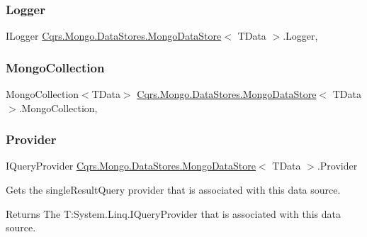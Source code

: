 \subsubsection{\texorpdfstring{Logger}{Logger}}
{\footnotesize\ttfamily I\+Logger \hyperlink{classCqrs_1_1Mongo_1_1DataStores_1_1MongoDataStore}{Cqrs.\+Mongo.\+Data\+Stores.\+Mongo\+Data\+Store}$<$ T\+Data $>$.Logger\hspace{0.3cm}{\ttfamily [get]}, {\ttfamily [protected]}}

\mbox{\label{classCqrs_1_1Mongo_1_1DataStores_1_1MongoDataStore_aa183a8ce44ec16d755f1e4fbe5ec4b10_aa183a8ce44ec16d755f1e4fbe5ec4b10}} 
\subsubsection{\texorpdfstring{Mongo\+Collection}{MongoCollection}}
{\footnotesize\ttfamily Mongo\+Collection$<$T\+Data$>$ \hyperlink{classCqrs_1_1Mongo_1_1DataStores_1_1MongoDataStore}{Cqrs.\+Mongo.\+Data\+Stores.\+Mongo\+Data\+Store}$<$ T\+Data $>$.Mongo\+Collection\hspace{0.3cm}{\ttfamily [get]}, {\ttfamily [protected]}}

\mbox{\label{classCqrs_1_1Mongo_1_1DataStores_1_1MongoDataStore_ae5de32a7a0da67a8aeaed9653db796ce_ae5de32a7a0da67a8aeaed9653db796ce}} 
\subsubsection{\texorpdfstring{Provider}{Provider}}
{\footnotesize\ttfamily I\+Query\+Provider \hyperlink{classCqrs_1_1Mongo_1_1DataStores_1_1MongoDataStore}{Cqrs.\+Mongo.\+Data\+Stores.\+Mongo\+Data\+Store}$<$ T\+Data $>$.Provider\hspace{0.3cm}{\ttfamily [get]}}



Gets the single\+Result\+Query provider that is associated with this data source. 

\begin{DoxyReturn}{Returns}
The T\+:\+System.\+Linq.\+I\+Query\+Provider that is associated with this data source. 
\end{DoxyReturn}
